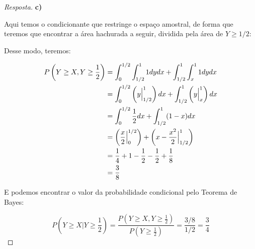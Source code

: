 \documentclass[
]{article}
\theoremstyle{definition}
\theoremstyle{definition}
\theoremstyle{definition}
\theoremstyle{definition}
\theoremstyle{remark}
\begin{document}
\begin{proof}[Resposta]
\textbf{c)}

Aqui temos o condicionante que restringe o espaço amostral, de forma que teremos que encontrar a área hachurada a seguir, dividida pela área de \(Y \ge 1/2\):

\begin{center}
\end{center}

Desse modo, teremos:

\begin{align*}
P\left(Y \ge X, Y \ge \frac{1}{2}\right) &= \int_{0}^{1/2}\int_{1/2}^{1}1dydx + \int_{1/2}^{1}\int_{x}^{1}1dydx \\
&= \int_{0}^{1/2}\left(y\Big{|}_{1/2}^{1}\right)dx + \int_{1/2}^{1}\left(y\Big{|}_{x}^{1}\right)dx \\
&= \int_{0}^{1/2}\frac{1}{2}dx + \int_{1/2}^{1}(1-x)dx \\
&= \left(\frac{x}{2}\Big{|}_{0}^{1/2}\right) + \left(x - \frac{x^{2}}{2}\Big{|}_{1/2}^{1}\right) \\
&= \frac{1}{4} + 1 - \frac{1}{2} - \frac{1}{2} + \frac{1}{8} \\
&= \frac{3}{8}
\end{align*}

E podemos encontrar o valor da probabilidade condicional pelo Teorema de Bayes:

\begin{equation*}
P\left(Y \ge X | Y \ge \frac{1}{2}\right) = \frac{P\left(Y \ge X, Y \ge \frac{1}{2}\right)}{P\left(Y \ge \frac{1}{2}\right)} = \frac{3/8}{1/2} = \frac{3}{4}
\end{equation*}
\end{proof}
\end{document}
